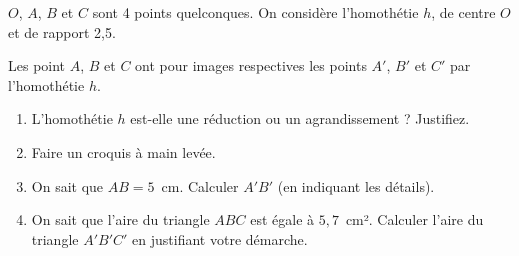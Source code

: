\begin{minipage}{0.99\linewidth}

\exo

$O$, $A$, $B$ et $C$ sont 4 points quelconques.
On considère l'homothétie $h$, de centre $O$ et de rapport 2,5.\par 
Les point $A$, $B$ et $C$ ont pour images respectives les points $A'$, $B'$ et $C'$ par l'homothétie $h$.

\begin{enumerate}

\item L'homothétie $h$ est-elle une réduction ou un agrandissement ? Justifiez.

\item Faire un croquis à main levée.

\item On sait que $AB =5$~cm. Calculer $A'B'$ (en indiquant les détails). 

\item On sait que l'aire du triangle $ABC$ est égale à $5,7$~cm². Calculer l'aire du triangle $A'B'C'$ en justifiant votre démarche.

\end{enumerate}

\end{minipage}

\vspace{0.5cm}

